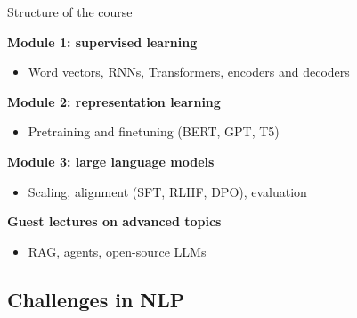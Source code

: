 \documentclass[usenames,dvipsnames,notes,11pt,aspectratio=169]{beamer}
\begin{document}
\begin{frame}
    {Structure of the course}
    \begin{wideitemize}
        \item {\bf Module 1: supervised learning}\\
            \begin{itemize}
                \item Word vectors, RNNs, Transformers, encoders and decoders
            \end{itemize}

        \item {\bf Module 2: representation learning}\\
            \begin{itemize}
                \item Pretraining and finetuning (BERT, GPT, T5)
            \end{itemize}

        \item {\bf Module 3: large language models} \\
            \begin{itemize}
                \item Scaling, alignment (SFT, RLHF, DPO), evaluation  
            \end{itemize}

        \item {\bf Guest lectures on advanced topics} \\
            \begin{itemize}
                \item RAG, agents, open-source LLMs 
            \end{itemize}
    \end{wideitemize}
\end{frame}

\subsection{Challenges in NLP}
\end{document}
